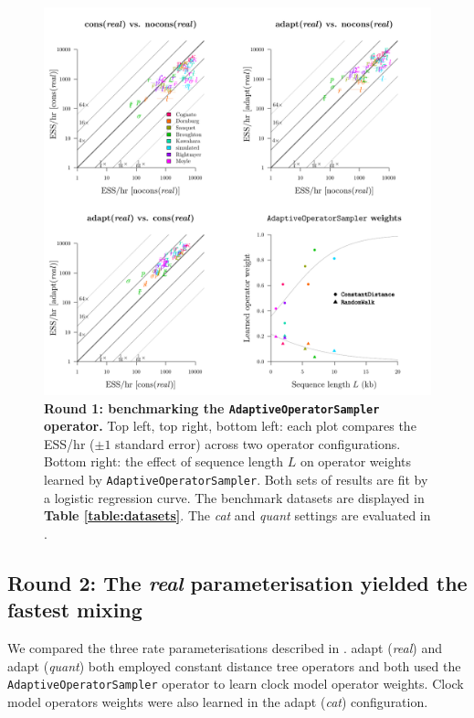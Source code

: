 \documentclass[10pt,letterpaper]{article}
\begin{document}
\begin{figure}[!h]
\includegraphics[width=\textwidth]{benchmarking/benchmarkingVM/ESS_round1_real.pdf}
\caption{\textbf{Round 1: benchmarking the \texttt{AdaptiveOperatorSampler} operator.} Top left, top right, bottom left: each plot compares the ESS/hr ($\pm 1$ standard error) across two operator configurations.
Bottom right: the effect of sequence length $L$ on operator weights learned by \texttt{AdaptiveOperatorSampler}. Both sets of results are fit by a logistic regression curve.
 The benchmark datasets are displayed in \textbf{Table \ref{table:datasets}}. The \emph{cat} and \emph{quant} settings are evaluated in \textbf{}.  }
\label{fig:round1Results}
\end{figure}








\clearpage
\subsection*{Round 2: The \textit{real} parameterisation yielded the fastest mixing }

We compared the three rate parameterisations described in \textbf{}. 
adapt (\textit{real}) and adapt (\textit{quant}) both employed constant distance tree operators \cite{zhang2020improving} and both used the \texttt{AdaptiveOperatorSampler} operator to learn clock model operator weights.
Clock model operators weights were also learned in the adapt (\textit{cat}) configuration.
\end{document}
